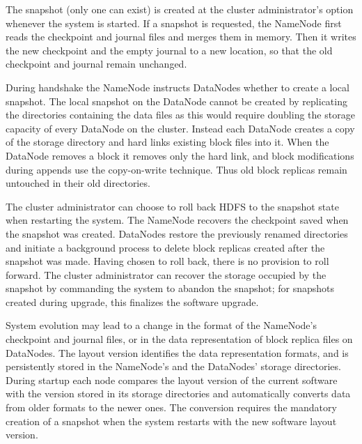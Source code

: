 The snapshot (only one can exist) is created at the cluster administrator's option whenever the system is started. If a snapshot is requested, the NameNode first reads the checkpoint and journal files and merges them in memory. Then it writes the new checkpoint and the empty journal to a new location, so that the old checkpoint and journal remain unchanged.

During handshake the NameNode instructs DataNodes whether to create a local snapshot. The local snapshot on the DataNode cannot be created by replicating the directories containing the data files as this would require doubling the storage capacity of every DataNode on the cluster. Instead each DataNode creates a copy of the storage directory and hard links existing block files into it. When the DataNode removes a block it removes only the hard link, and block modifications during appends use the copy-on-write technique. Thus old block replicas remain untouched in their old directories.

The cluster administrator can choose to roll back HDFS to the snapshot state when restarting the system. The NameNode recovers the checkpoint saved when the snapshot was created. DataNodes restore the previously renamed directories and initiate a background process to delete block replicas created after the snapshot was made. Having chosen to roll back, there is no provision to roll forward. The cluster administrator can recover the storage occupied by the snapshot by commanding the system to abandon the snapshot; for snapshots created during upgrade, this finalizes the software upgrade.

System evolution may lead to a change in the format of the NameNode's checkpoint and journal files, or in the data representation of block replica files on DataNodes. The layout version identifies the data representation formats, and is persistently stored in the NameNode's and the DataNodes' storage directories. During startup each node compares the layout version of the current software with the version stored in its storage directories and automatically converts data from older formats to the newer ones. The conversion requires the mandatory creation of a snapshot when the system restarts with the new software layout version.







